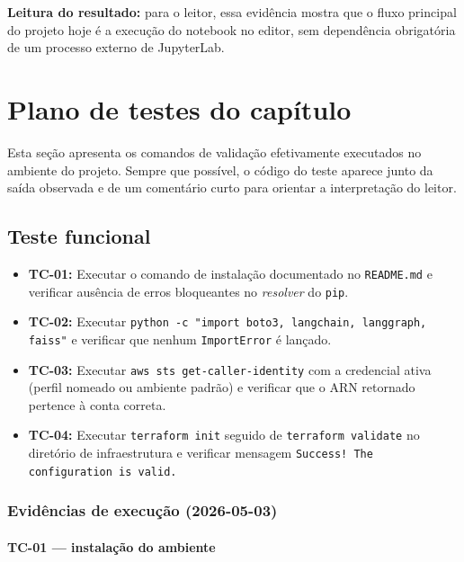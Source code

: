 \noindent\textbf{Leitura do resultado:} para o leitor, essa evid\^encia
mostra que o fluxo principal do projeto hoje \'e a execu\c{c}\~ao do
notebook no editor, sem depend\^encia obrigat\'oria de um processo
externo de JupyterLab.

\section{Plano de testes do cap\'itulo}

Esta se\c{c}\~ao apresenta os comandos de valida\c{c}\~ao efetivamente
executados no ambiente do projeto. Sempre que poss\'ivel, o c\'odigo do
teste aparece junto da sa\'ida observada e de um coment\'ario curto para
orientar a interpreta\c{c}\~ao do leitor.

\subsection{Teste funcional}

\begin{itemize}[leftmargin=*]
  \item \textbf{TC-01:} Executar o comando de instala\c{c}\~ao
        documentado no \texttt{README.md} e verificar aus\^encia de
        erros bloqueantes no \textit{resolver} do \texttt{pip}.
  \item \textbf{TC-02:} Executar \texttt{python -c "import boto3,
        langchain, langgraph, faiss"} e verificar que nenhum
        \texttt{ImportError} \'e lan\c{c}ado.
  \item \textbf{TC-03:} Executar \texttt{aws sts get-caller-identity}
        com a credencial ativa (perfil nomeado ou ambiente padr\~ao) e
        verificar que o ARN retornado pertence \`a conta correta.
  \item \textbf{TC-04:} Executar \texttt{terraform init} seguido de
        \texttt{terraform validate} no diret\'orio de infraestrutura e
        verificar mensagem
        \texttt{Success! The configuration is valid.}
\end{itemize}

\subsubsection*{Evid\^encias de execu\c{c}\~ao (2026-05-03)}

\paragraph{TC-01 --- instala\c{c}\~ao do ambiente}

